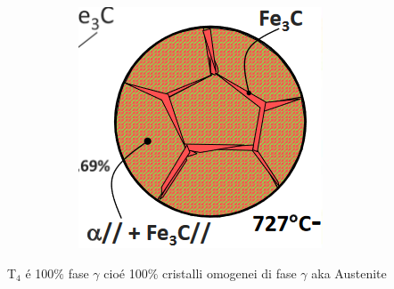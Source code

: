\documentclass{article}
\begin{document}
{\begin{figure}
\begin{subfigure}[h!]{0.6\linewidth}
                \end{subfigure}
                \begin{subfigure}[h!]{0.3\linewidth}
                    \includegraphics[width=\linewidth]{L13 - Struttura del sistema dopo l'eutettoidico.png}
                \end{subfigure}
            \end{figure}
            \newpage
            T$_4$ \'e 100$\%$ fase $\gamma$ cio\'e 100$\%$ cristalli omogenei di fase $\gamma$ aka Austenite
}
\end{document}
